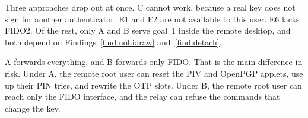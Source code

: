 Three approaches drop out at once. C cannot work, because a real key does not
sign for another authenticator. E1 and E2 are not available to this user. E6
lacks FIDO2. Of the rest, only A and B serve goal~1 inside the remote
desktop, and both depend on Findings~\ref{find:nohidraw}
and~\ref{find:detach}.

A forwards everything, and B forwards only FIDO. That is the main difference
in risk. Under A, the remote root user can reset the PIV and OpenPGP applets,
use up their PIN tries, and rewrite the OTP slots. Under B, the remote root
user can reach only the FIDO interface, and the relay can refuse the commands
that change the key.

